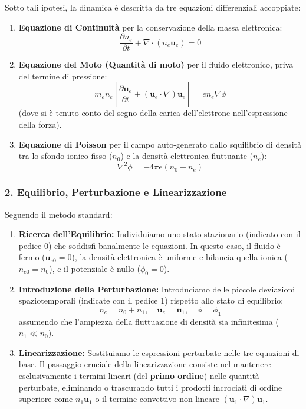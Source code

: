 Sotto tali ipotesi, la dinamica è descritta da tre equazioni differenziali accoppiate:
\begin{enumerate}
\item \textbf{Equazione di Continuità} per la conservazione della massa elettronica:
\begin{equation}
\frac{\partial n_e}{\partial t} + \nabla \cdot (n_e \mathbf{u}_e) = 0
\end{equation}
\item \textbf{Equazione del Moto (Quantità di moto)} per il fluido elettronico, priva del termine di pressione:
\begin{equation}
m_e n_e \left[ \frac{\partial \mathbf{u}_e}{\partial t} + (\mathbf{u}_e \cdot \nabla)\mathbf{u}_e \right] = e n_e \nabla\phi
\end{equation}
(dove si è tenuto conto del segno della carica dell'elettrone nell'espressione della forza).
\item \textbf{Equazione di Poisson} per il campo auto-generato dallo squilibrio di densità tra lo sfondo ionico fisso ($n_0$) e la densità elettronica fluttuante ($n_e$):
\begin{equation}
\nabla^2\phi = -4\pi e (n_0 - n_e)
\end{equation}
\end{enumerate}

\subsubsection{2. Equilibrio, Perturbazione e Linearizzazione}
Seguendo il metodo standard:
\begin{enumerate}
\item \textbf{Ricerca dell'Equilibrio:} Individuiamo uno stato stazionario (indicato con il pedice 0) che soddisfi banalmente le equazioni. In questo caso, il fluido è fermo ($\mathbf{u}_{e0} = 0$), la densità elettronica è uniforme e bilancia quella ionica ($n_{e0} = n_0$), e il potenziale è nullo ($\phi_0 = 0$).
\item \textbf{Introduzione della Perturbazione:} Introduciamo delle piccole deviazioni spaziotemporali (indicate con il pedice 1) rispetto allo stato di equilibrio:
\begin{equation}
n_e = n_0 + n_1, \quad \mathbf{u}_e = \mathbf{u}_1, \quad \phi = \phi_1
\end{equation}
assumendo che l'ampiezza della fluttuazione di densità sia infinitesima ($n_1 \ll n_0$).
\item \textbf{Linearizzazione:} Sostituiamo le espressioni perturbate nelle tre equazioni di base. Il passaggio cruciale della linearizzazione consiste nel mantenere esclusivamente i termini lineari (del \textbf{primo ordine}) nelle quantità perturbate, eliminando o trascurando tutti i prodotti incrociati di ordine superiore come $n_1\mathbf{u}_1$ o il termine convettivo non lineare $(\mathbf{u}_1 \cdot \nabla)\mathbf{u}_1$.
\end{enumerate}

